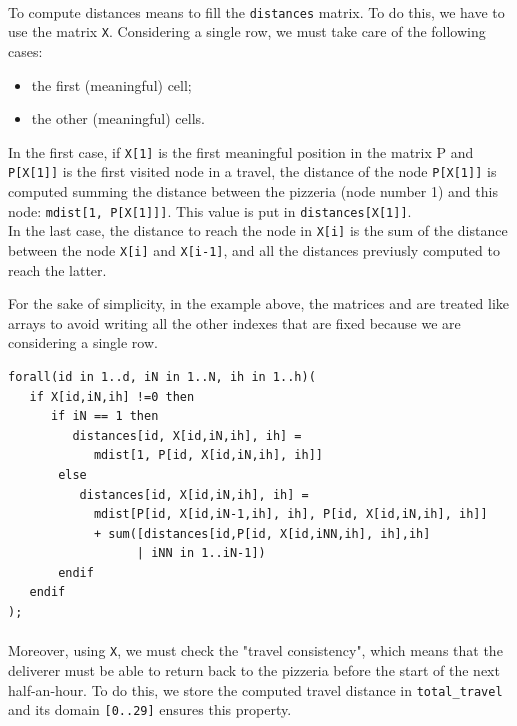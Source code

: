 \documentclass[10pt]{article}
\begin{document}
	\paragraph*{}
	To compute distances means to fill the \texttt{distances} matrix.
    To do this, we have to use the matrix \texttt{X}. 
	Considering a single row, we must take care of the following cases:
	\begin{itemize}
		\item the first (meaningful) cell;
		\item the other (meaningful) cells.
	\end{itemize}
	
	
	In the first case, if \texttt{X[1]} is the first meaningful position in the 
	matrix P and \texttt{P[X[1]]} is the first visited node in a travel,
	the distance of the node \texttt{P[X[1]]} is computed summing the 
	distance between the pizzeria (node number 1) and this node: \texttt{mdist[1, P[X[1]]]}.
	This value is put in \texttt{distances[X[1]]}.\\
	
	In the last case, the distance to reach the node in \texttt{X[i]} is 
	the sum of the distance between the node \texttt{X[i]} and \texttt{X[i-1]}, and all 
	the distances previusly computed to reach the latter. 
	
	For the sake of simplicity, in the example above, the matrices  and  are treated 
	like arrays to avoid writing all the other indexes that are fixed because we are considering a single 
	row.

	
	\begin{verbatim}
forall(id in 1..d, iN in 1..N, ih in 1..h)(
   if X[id,iN,ih] !=0 then
      if iN == 1 then
         distances[id, X[id,iN,ih], ih] = 
            mdist[1, P[id, X[id,iN,ih], ih]] 
       else
          distances[id, X[id,iN,ih], ih] = 
            mdist[P[id, X[id,iN-1,ih], ih], P[id, X[id,iN,ih], ih]] 
         	+ sum([distances[id,P[id, X[id,iNN,ih], ih],ih]
                  | iNN in 1..iN-1])
       endif
   endif
);
	\end{verbatim}

	\paragraph*{}
	Moreover, using \texttt{X}, we must check the "travel consistency", which 
	means that the deliverer must be able to return back to the pizzeria before the 
	start of the next half-an-hour. 
	To do this, we store the computed travel distance in \texttt{total\_travel} and its 
	domain \texttt{[0..29]} ensures this property.  
\end{document}
